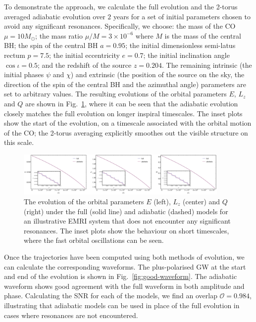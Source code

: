 \documentclass[aps,prd,amsfonts,amssymb,amsmath,nofootinbib,reprint,showpacs]{revtex4}
\newcommand{\figref}[1]{Fig.\ \ref{fig:#1}}
\begin{document}
To demonstrate the approach, we calculate the full evolution and the 2-torus averaged adiabatic evolution over $2$ years for a set of initial parameters chosen to avoid any significant resonances. Specifically, we choose: the mass of the CO $\mu = 10 M_{\odot}$; the mass ratio $\mu / M = 3\times 10^{-6}$ where $M$ is the mass of the central BH; the spin of the central BH $a=0.95$; the initial dimensionless semi-latus rectum $p=7.5$; the initial eccentricity $e=0.7$; the initial inclination angle $\cos \iota = 0.5$; and the redshift of the source $z=0.204$. The remaining intrinsic (the initial phases $\psi$ and $\chi$) and extrinsic (the position of the source on the sky, the direction of the spin of the central BH and the azimuthal angle) parameters are set to arbitrary values. The resulting evolutions of the orbital parameters $E$, $L_z$ and $Q$ are shown in \figref{good-traj}, where it can be seen that the adiabatic evolution closely matches the full evolution on longer inspiral timescales. The inset plots show the start of the evolution, on a timescale associated with the orbital motion of the CO; the 2-torus averaging explicitly smoothes out the visible structure on this scale.

\begin{figure}[htbp]
\centering
\includegraphics[width=0.92\textwidth]{Fig_good_traj}
\caption{\label{fig:good-traj}The evolution of the orbital parameters $E$ (left), $L_z$ (center) and $Q$ (right) under the full (solid line) and adiabatic (dashed) models for an illustrative EMRI system that does not encounter any significant resonances. The inset plots show the behaviour on short timescales, where the fast orbital oscillations can be seen.}
\end{figure}

Once the trajectories have been computed using both methods of evolution, we can calculate the corresponding waveforms. The plus-polarised GW at the start and end of the evolution is shown in \figref{good-waveform}. The adiabatic waveform shows good agreement with the full waveform in both amplitude and phase. Calculating the SNR for each of the models, we find an overlap $\mathcal{O} = 0.984$, illustrating that adiabatic models can be used in place of the full evolution in cases where resonances are not encountered.
\end{document}
